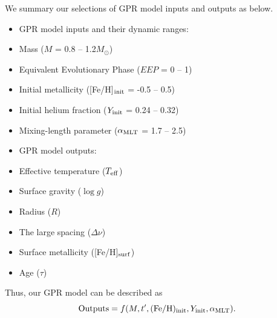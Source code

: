 We summary our selections of GPR model inputs and outputs as below. 
\begin{itemize}
\item GPR model inputs and their dynamic ranges:
\item[] Mass ($M$ = 0.8 -- 1.2$M_{\odot}$)
\item[] Equivalent Evolutionary Phase ($EEP$ = 0 -- 1)
\item[] Initial metallicity ([Fe/H]$_{\rm init}$ =  -0.5 -- 0.5)
\item[] Initial helium fraction ($Y_{\rm init}$ = 0.24 -- 0.32)
\item[] Mixing-length parameter ($\alpha_{\rm MLT}$ = 1.7 -- 2.5)
\item GPR model outputs: 
\item[] Effective temperature ($T_{\rm eff}$) 
\item[] Surface gravity ($\log g$)
\item[] Radius ($R$)
\item[] The large spacing ($\Delta\nu$)  
\item[] Surface metallicity ([Fe/H]$_{\rm surf}$)
\item[] Age ($\tau$)
\end{itemize}
Thus, our GPR model can be described as 
\begin{equation}\label{gprmodel}
{\rm Outputs} = f(M, t', ({\rm Fe/H})_{\rm init}, Y_{\rm init}, \alpha_{\rm MLT}). 
\end{equation}

